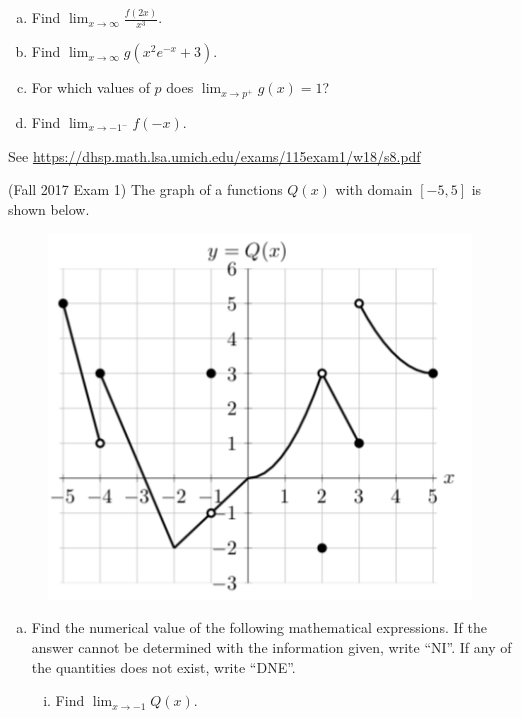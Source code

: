 \documentclass[11pt]{exam}
\begin{document}
\begin{questions}
\begin{enumerate}[(a)]
\item Find $\displaystyle\lim_{x \rightarrow \infty} \frac{f(2x)}{x^3}$.

  
\item Find $\displaystyle\lim_{x \rightarrow \infty} g(x^2e^{-x} + 3)$.

\item For which values of \(p\) does $\displaystyle\lim_{x \rightarrow p^+} g(x)= 1$?

\item Find $\displaystyle\lim_{x \rightarrow -1^-} f(-x)$.
\end{enumerate}
\begin{solution}
 See \href{https://dhsp.math.lsa.umich.edu/exams/115exam1/w18/s8.pdf}{https://dhsp.math.lsa.umich.edu/exams/115exam1/w18/s8.pdf}
\end{solution}
\pagebreak
\question (Fall 2017 Exam 1) The graph of a functions $Q(x)$ with domain $[-5,5]$ is shown below.

\begin{figure}[h]
\includegraphics[scale=0.5]{Figures/discontinuities2}
\end{figure}
\begin{enumerate}[(a)]
\item Find the numerical value of the following mathematical expressions. If the answer cannot be determined with the information given, write “NI”. If any of the quantities does not exist, write “DNE”.
\begin{enumerate}[(i)]
\item Find $\displaystyle\lim_{x \rightarrow -1} Q(x)$.


\end{enumerate}
\end{enumerate}
\end{questions}
\end{document}
